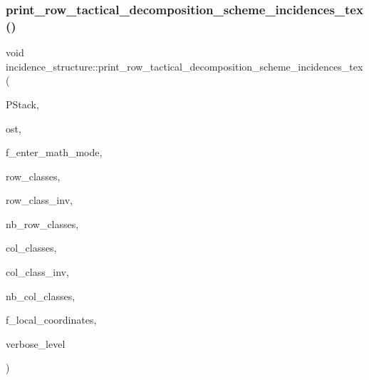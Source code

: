 \subsubsection{\texorpdfstring{print\+\_\+row\+\_\+tactical\+\_\+decomposition\+\_\+scheme\+\_\+incidences\+\_\+tex()}{print\_row\_tactical\_decomposition\_scheme\_incidences\_tex()}}
{\footnotesize\ttfamily void incidence\+\_\+structure\+::print\+\_\+row\+\_\+tactical\+\_\+decomposition\+\_\+scheme\+\_\+incidences\+\_\+tex (\begin{DoxyParamCaption}\item[{\mbox{\hyperlink{classpartitionstack}{partitionstack}} \&}]{P\+Stack,  }\item[{ostream \&}]{ost,  }\item[{\mbox{\hyperlink{galois_8h_a09fddde158a3a20bd2dcadb609de11dc}{I\+NT}}}]{f\+\_\+enter\+\_\+math\+\_\+mode,  }\item[{\mbox{\hyperlink{galois_8h_a09fddde158a3a20bd2dcadb609de11dc}{I\+NT}} $\ast$}]{row\+\_\+classes,  }\item[{\mbox{\hyperlink{galois_8h_a09fddde158a3a20bd2dcadb609de11dc}{I\+NT}} $\ast$}]{row\+\_\+class\+\_\+inv,  }\item[{\mbox{\hyperlink{galois_8h_a09fddde158a3a20bd2dcadb609de11dc}{I\+NT}}}]{nb\+\_\+row\+\_\+classes,  }\item[{\mbox{\hyperlink{galois_8h_a09fddde158a3a20bd2dcadb609de11dc}{I\+NT}} $\ast$}]{col\+\_\+classes,  }\item[{\mbox{\hyperlink{galois_8h_a09fddde158a3a20bd2dcadb609de11dc}{I\+NT}} $\ast$}]{col\+\_\+class\+\_\+inv,  }\item[{\mbox{\hyperlink{galois_8h_a09fddde158a3a20bd2dcadb609de11dc}{I\+NT}}}]{nb\+\_\+col\+\_\+classes,  }\item[{\mbox{\hyperlink{galois_8h_a09fddde158a3a20bd2dcadb609de11dc}{I\+NT}}}]{f\+\_\+local\+\_\+coordinates,  }\item[{\mbox{\hyperlink{galois_8h_a09fddde158a3a20bd2dcadb609de11dc}{I\+NT}}}]{verbose\+\_\+level }\end{DoxyParamCaption})}

\mbox{\label{classincidence__structure_ad692ab2f42456aeee575311c2cdbbdf9}} 
